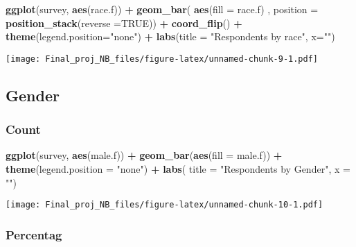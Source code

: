 \documentclass[]{article}
\newenvironment{Shaded}{\begin{snugshade}}{\end{snugshade}}
\newcommand{\KeywordTok}[1]{\textcolor[rgb]{0.13,0.29,0.53}{\textbf{#1}}}
\newcommand{\DataTypeTok}[1]{\textcolor[rgb]{0.13,0.29,0.53}{#1}}
\newcommand{\StringTok}[1]{\textcolor[rgb]{0.31,0.60,0.02}{#1}}
\newcommand{\OtherTok}[1]{\textcolor[rgb]{0.56,0.35,0.01}{#1}}
\newcommand{\OperatorTok}[1]{\textcolor[rgb]{0.81,0.36,0.00}{\textbf{#1}}}
\newcommand{\NormalTok}[1]{#1}
\begin{document}
\begin{Shaded}
\begin{Highlighting}[]
\KeywordTok{ggplot}\NormalTok{(survey, }\KeywordTok{aes}\NormalTok{(race.f)) }\OperatorTok{+}
\StringTok{  }\KeywordTok{geom_bar}\NormalTok{( }\KeywordTok{aes}\NormalTok{(}\DataTypeTok{fill =}\NormalTok{ race.f) , }\DataTypeTok{position =} \KeywordTok{position_stack}\NormalTok{(}\DataTypeTok{reverse =}\OtherTok{TRUE}\NormalTok{)) }\OperatorTok{+}
\StringTok{  }\KeywordTok{coord_flip}\NormalTok{() }\OperatorTok{+}\StringTok{ }\KeywordTok{theme}\NormalTok{(}\DataTypeTok{legend.position=}\StringTok{"none"}\NormalTok{) }\OperatorTok{+}\StringTok{ }
\StringTok{  }\KeywordTok{labs}\NormalTok{(}\DataTypeTok{title =} \StringTok{"Respondents by race"}\NormalTok{, }\DataTypeTok{x=}\StringTok{""}\NormalTok{)}
\end{Highlighting}
\end{Shaded}

\texttt{[image: Final\_proj\_NB\_files/figure-latex/unnamed-chunk-9-1.pdf]}

\subsection{Gender}\label{gender}

\subsubsection{Count}\label{count-1}

\begin{Shaded}
\begin{Highlighting}[]
\KeywordTok{ggplot}\NormalTok{(survey, }\KeywordTok{aes}\NormalTok{(male.f)) }\OperatorTok{+}
\StringTok{  }\KeywordTok{geom_bar}\NormalTok{(}\KeywordTok{aes}\NormalTok{(}\DataTypeTok{fill =}\NormalTok{ male.f)) }\OperatorTok{+}
\StringTok{  }\KeywordTok{theme}\NormalTok{(}\DataTypeTok{legend.position =} \StringTok{"none"}\NormalTok{) }\OperatorTok{+}\StringTok{ }\KeywordTok{labs}\NormalTok{( }\DataTypeTok{title =} \StringTok{"Respondents by Gender"}\NormalTok{, }\DataTypeTok{x =} \StringTok{""}\NormalTok{)}
\end{Highlighting}
\end{Shaded}

\texttt{[image: Final\_proj\_NB\_files/figure-latex/unnamed-chunk-10-1.pdf]}

\subsubsection{Percentag}\label{percentag}
\end{document}
